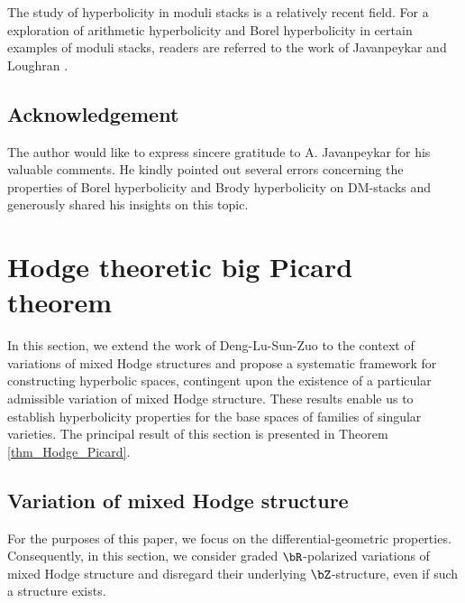 \documentclass[11pt,letterpaper]{amsart}
\numberwithin{equation}{section}
\begin{document}
	The study of hyperbolicity in moduli stacks is a relatively recent field. For a exploration of arithmetic hyperbolicity and Borel hyperbolicity in certain examples of moduli stacks, readers are referred to the work of Javanpeykar and Loughran \cite{Javanpeykar2021}.
    \subsection{Acknowledgement}
	The author would like to express sincere gratitude to A. Javanpeykar for his valuable comments. He kindly pointed out several errors concerning the properties of Borel hyperbolicity and Brody hyperbolicity on DM-stacks and generously shared his insights on this topic.
	\section{Hodge theoretic big Picard theorem}
	In this section, we extend the work of Deng-Lu-Sun-Zuo \cite{DLSZ} to the context of variations of mixed Hodge structures and propose a systematic framework for constructing hyperbolic spaces, contingent upon the existence of a particular admissible variation of mixed Hodge structure. These results enable us to establish hyperbolicity properties for the base spaces of families of singular varieties. The principal result of this section is presented in Theorem \ref{thm_Hodge_Picard}.
	\subsection{Variation of mixed Hodge structure}
	For the purposes of this paper, we focus on the differential-geometric properties. Consequently, in this section, we consider graded $\bR$-polarized variations of mixed Hodge structure and disregard their underlying $\bZ$-structure, even if such a structure exists.
	
\end{document}
